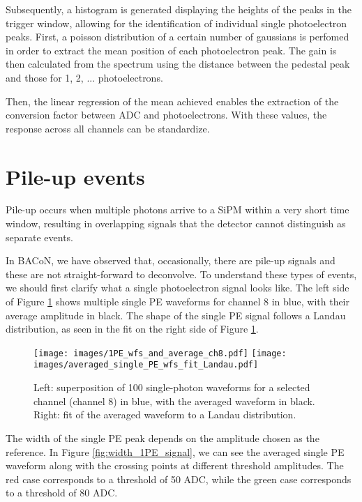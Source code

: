 \documentclass[11pt,a4paper,english,oneside, pdf]{article}
\begin{document}
	
	Subsequently, a histogram is generated displaying the heights of the peaks in the trigger window, allowing for the identification of individual single photoelectron peaks. First, a poisson distribution of a certain number of gaussians is perfomed in order to extract the mean position of each photoelectron peak. The gain is then calculated from the spectrum using the distance between the pedestal peak and those for 1, 2, ...  photoelectrons.
	
	
	Then, the linear regression of the mean achieved enables the extraction of the conversion factor between ADC and photoelectrons. With these values, the response across all channels can be standardize.
	
	
	
	\clearpage
	
	\section{Pile-up events}
	
	Pile-up occurs when multiple photons arrive to a SiPM within a very short time window, resulting in overlapping signals that the detector cannot distinguish as separate events.
	
	In BACoN, we have observed that, occasionally, there are pile-up signals and these are not straight-forward to deconvolve. To understand these types of events, we should first clarify what a single photoelectron signal looks like. The left side of Figure \ref{fig:1PE_signal} shows multiple single PE waveforms for channel 8 in blue, with their average amplitude in black. The shape of the single PE signal follows a Landau distribution, as seen in the fit on the right side of Figure \ref{fig:1PE_signal}.
	
	\begin{figure}[!h]
		\begin{center}
			\texttt{[image: images/1PE\_wfs\_and\_average\_ch8.pdf]}
			\texttt{[image: images/averaged\_single\_PE\_wfs\_fit\_Landau.pdf]}
			\caption{Left: superposition of 100 single-photon waveforms for a selected channel (channel 8) in blue, with the averaged waveform in black. Right: fit of the averaged waveform to a Landau distribution.}
			\label{fig:1PE_signal}
		\end{center}
	\end{figure}
	
	The width of the single PE peak depends on the amplitude chosen as the reference. In Figure \ref{fig:width_1PE_signal}, we can see the averaged single PE waveform along with the crossing points at different threshold amplitudes. The red case corresponds to a threshold of 50 ADC, while the green case corresponds to a threshold of 80 ADC.
	
\end{document}
